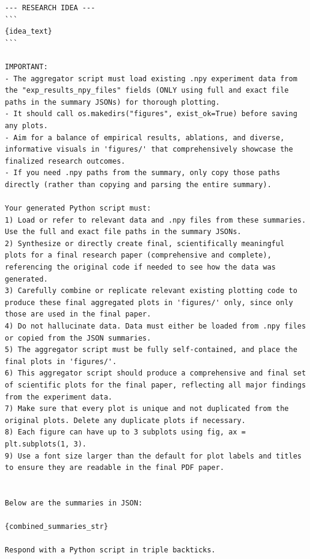 \begin{appendices}
\begin{tcolorbox}[breakable, colback=orange!5!white, colframe=orange!80!black, title=Plot Aggregation Prompt]
\begin{Verbatim}[breaklines, breaksymbol={}, breaksymbolleft={}, fontsize=\small]
--- RESEARCH IDEA ---
```
{idea_text}
```

IMPORTANT:
- The aggregator script must load existing .npy experiment data from the "exp_results_npy_files" fields (ONLY using full and exact file paths in the summary JSONs) for thorough plotting.
- It should call os.makedirs("figures", exist_ok=True) before saving any plots.
- Aim for a balance of empirical results, ablations, and diverse, informative visuals in 'figures/' that comprehensively showcase the finalized research outcomes.
- If you need .npy paths from the summary, only copy those paths directly (rather than copying and parsing the entire summary).

Your generated Python script must:
1) Load or refer to relevant data and .npy files from these summaries. Use the full and exact file paths in the summary JSONs.
2) Synthesize or directly create final, scientifically meaningful plots for a final research paper (comprehensive and complete), referencing the original code if needed to see how the data was generated.
3) Carefully combine or replicate relevant existing plotting code to produce these final aggregated plots in 'figures/' only, since only those are used in the final paper.
4) Do not hallucinate data. Data must either be loaded from .npy files or copied from the JSON summaries.
5) The aggregator script must be fully self-contained, and place the final plots in 'figures/'.
6) This aggregator script should produce a comprehensive and final set of scientific plots for the final paper, reflecting all major findings from the experiment data.
7) Make sure that every plot is unique and not duplicated from the original plots. Delete any duplicate plots if necessary.
8) Each figure can have up to 3 subplots using fig, ax = plt.subplots(1, 3).
9) Use a font size larger than the default for plot labels and titles to ensure they are readable in the final PDF paper.


Below are the summaries in JSON:

{combined_summaries_str}

Respond with a Python script in triple backticks.
\end{Verbatim}
\end{tcolorbox}


\end{appendices}
